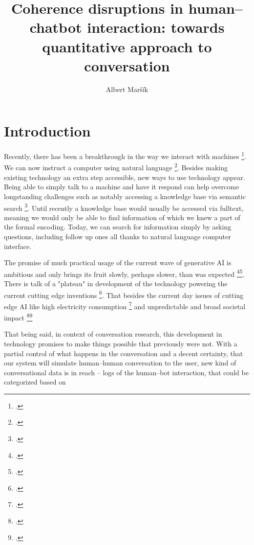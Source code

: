 \documentclass[12pt]{report}
\title{Coherence disruptions in human–chatbot interaction: towards quantitative approach to conversation}
\date{}
\author{Albert Maršík}
\begin{document}


\maketitle

\chapter*{Introduction}

\par
Recently, there has been a breakthrough in the way we interact with machines \footcite{sharma2024exploring}.
We can now instruct a computer using natural language \footcite{hendrix1982natural}.
Besides making existing technology an extra step accessible,
new ways to use technology appear.
Being able to simply talk to a machine and have it respond
can help overcome longstanding challenges
such as notably accessing a knowledge base via semantic search \footcite{makela2005survey}.
Until recently a knowledge base would usually be accessed via fulltext,
meaning we would only be able to find
information of which we knew a part of the formal encoding.
Today, we can search for information simply by asking questions,
including follow up ones
all thanks to natural language computer interface.
\par
The promise of much practical usage of the current wave of generative AI is ambitious
and only brings its fruit slowly, perhaps slower, than was expected
\footcite{bloomberg2024openai1}\footcite{reuters2024openai}.
There is talk of a "plateau" in development of the technology powering
the current cutting edge inventions \footcite{ritter2024ai}.
That besides the current day issues of cutting edge AI like
high electricity consumption \footcite{ritchie2024ai} and
unpredictable and broad societal impact \footcite{hagerty2019global}\footcite{baldassarre2023social}

That being said, in context of conversation research,
this development in technology promises to make things possible that previously were not.
With a partial control of what happens in the conversation and a decent certainty, that
our system will simulate human–human conversation to the user,
new kind of conversational data is in reach –
logs of the human–bot interaction, that could be categorized based on
\end{document}
